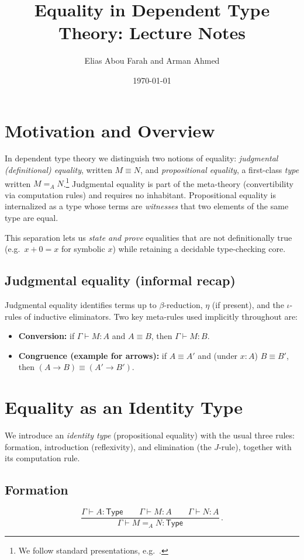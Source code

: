 \documentclass[11pt]{article}
\title{Equality in Dependent Type Theory: Lecture Notes}
\author{Elias Abou Farah and Arman Ahmed}
\date{\today}
\newcommand{\Type}{\mathsf{Type}}
\newcommand{\Id}[3]{#1 =_{#2} #3}
\newcommand{\ctx}{\Gamma}
\theoremstyle{definition}
\theoremstyle{plain}
\theoremstyle{remark}
\begin{document}
\maketitle
\tableofcontents

\section{Motivation and Overview}
In dependent type theory we distinguish two notions of equality:
\emph{judgmental (definitional) equality}, written $M \equiv N$, and \emph{propositional equality}, a first-class \emph{type} written $\Id{M}{A}{N}$.\footnote{We follow standard presentations, e.g.\ \cite{martinloef1984itt,harper2016pfpl,hottbook}.}
Judgmental equality is part of the meta-theory (convertibility via computation rules) and requires no inhabitant. Propositional equality is internalized as a type whose terms are \emph{witnesses} that two elements of the same type are equal.

This separation lets us \emph{state and prove} equalities that are not definitionally true (e.g.\ $x + 0 = x$ for symbolic $x$) while retaining a decidable type-checking core.


\subsection*{Judgmental equality (informal recap)}
Judgmental equality identifies terms up to $\beta$-reduction, $\eta$ (if present), and the $\iota$-rules of inductive eliminators. Two key meta-rules used implicitly throughout are:
\begin{itemize}[nosep]
  \item \textbf{Conversion:} if $\ctx \vdash M : A$ and $A \equiv B$, then $\ctx \vdash M : B$.
  \item \textbf{Congruence (example for arrows):} if $A \equiv A'$ and (under $x{:}A$) $B \equiv B'$, then $(A \to B) \equiv (A' \to B')$.
\end{itemize}
\section{Equality as an Identity Type}
We introduce an \emph{identity type} (propositional equality) with the usual three rules: formation, introduction (reflexivity), and elimination (the $J$-rule), together with its computation rule.

\subsection{Formation}
\begin{equation*}
\frac{\ctx \vdash A : \Type \qquad \ctx \vdash M : A \qquad \ctx \vdash N : A}{\ctx \vdash \Id{M}{A}{N} : \Type} \, .
\end{equation*}
\end{document}
